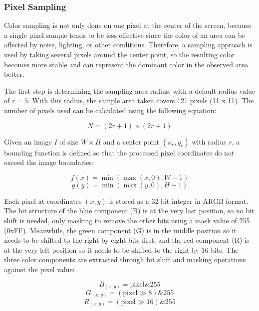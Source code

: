 \subsubsection{Pixel Sampling}

Color sampling is not only done on one pixel at the center of the screen, because a single pixel sample tends to be less effective since the color of an area can be affected by noise, lighting, or other conditions. Therefore, a sampling approach is used by taking several pixels around the center point, so the resulting color becomes more stable and can represent the dominant color in the observed area better.

The first step is determining the sampling area radius, with a default radius value of $r=5$. With this radius, the sample area taken covers 121 pixels (11 x 11). The number of pixels used can be calculated using the following equation:

\begin{equation}
N = (2r+1) \times (2r+1)
\end{equation}

Given an image $I$ of size $W \times H$ and a center point $(x_c, y_c)$ with radius $r$, a bounding function is defined so that the processed pixel coordinates do not exceed the image boundaries:

\begin{equation}
f(x) = \min(\max(x, 0), W-1)
\end{equation}
\begin{equation}
g(y) = \min(\max(y, 0), H-1)
\end{equation}

Each pixel at coordinates $(x,y)$ is stored as a 32-bit integer in ARGB format. The bit structure of the blue component (B) is at the very last position, so no bit shift is needed, only masking to remove the other bits using a mask value of 255 (0xFF). Meanwhile, the green component (G) is in the middle position so it needs to be shifted to the right by eight bits first, and the red component (R) is at the very left position so it needs to be shifted to the right by 16 bits. The three color components are extracted through bit shift and masking operations against the pixel value:

\begin{equation}
B_{(x,y)} = \text{pixel} \mathbin{\&} 255
\end{equation}
\begin{equation}
G_{(x,y)} = (\text{pixel} \gg 8) \mathbin{\&} 255
\end{equation}
\begin{equation}
R_{(x,y)} = (\text{pixel} \gg 16) \mathbin{\&} 255
\end{equation}

